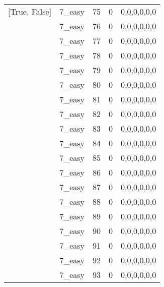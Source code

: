 \begin{tabular}{llrrl}
 [True, False]   & 7\_easy              &            75 &                     0 & 0,0,0,0,0,0   \\
 [True, False]   & 7\_easy              &            76 &                     0 & 0,0,0,0,0,0   \\
 [True, False]   & 7\_easy              &            77 &                     0 & 0,0,0,0,0,0   \\
 [True, False]   & 7\_easy              &            78 &                     0 & 0,0,0,0,0,0   \\
 [True, False]   & 7\_easy              &            79 &                     0 & 0,0,0,0,0,0   \\
 [True, False]   & 7\_easy              &            80 &                     0 & 0,0,0,0,0,0   \\
 [True, False]   & 7\_easy              &            81 &                     0 & 0,0,0,0,0,0   \\
 [True, False]   & 7\_easy              &            82 &                     0 & 0,0,0,0,0,0   \\
 [True, False]   & 7\_easy              &            83 &                     0 & 0,0,0,0,0,0   \\
 [True, False]   & 7\_easy              &            84 &                     0 & 0,0,0,0,0,0   \\
 [True, False]   & 7\_easy              &            85 &                     0 & 0,0,0,0,0,0   \\
 [True, False]   & 7\_easy              &            86 &                     0 & 0,0,0,0,0,0   \\
 [True, False]   & 7\_easy              &            87 &                     0 & 0,0,0,0,0,0   \\
 [True, False]   & 7\_easy              &            88 &                     0 & 0,0,0,0,0,0   \\
 [True, False]   & 7\_easy              &            89 &                     0 & 0,0,0,0,0,0   \\
 [True, False]   & 7\_easy              &            90 &                     0 & 0,0,0,0,0,0   \\
 [True, False]   & 7\_easy              &            91 &                     0 & 0,0,0,0,0,0   \\
 [True, False]   & 7\_easy              &            92 &                     0 & 0,0,0,0,0,0   \\
 [True, False]   & 7\_easy              &            93 &                     0 & 0,0,0,0,0,0   \\

\end{tabular}
